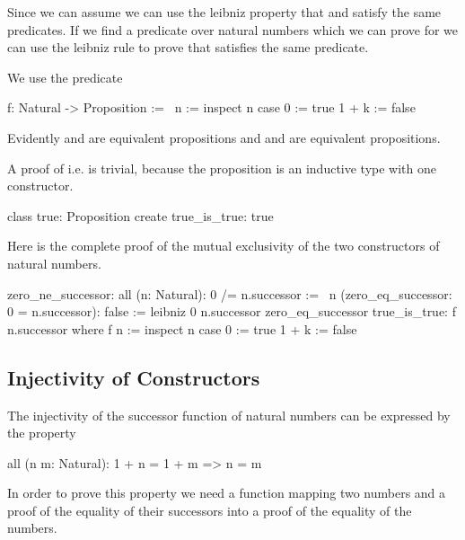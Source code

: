 Since we can assume  we can use the leibniz property that
 and  satisfy the same predicates. If we find a
predicate over natural numbers which we can prove for  we can use the
leibniz rule to prove that  satisfies the same predicate.

We use the predicate
\begin{alba}
    f: Natural -> Proposition :=
        \ n :=
            inspect n case
                0     := true
                1 + k := false
\end{alba}

Evidently  and  are equivalent propositions and  and  are equivalent propositions.

A proof of  i.e.  is trivial, because the proposition
 is an inductive type with one constructor.

\begin{alba}
    class
        true: Proposition
    create
        true_is_true: true
\end{alba}


Here is the complete proof of the mutual exclusivity of the two constructors of
natural numbers.


\begin{alba}
    zero_ne_successor:
        all (n: Natural): 0 /= n.successor
    :=
        \ n (zero_eq_successor: 0 = n.successor): false :=
            leibniz 0 n.successor zero_eq_successor true_is_true: f n.successor
            where
                f n :=
                    inspect n case
                        0     := true
                        1 + k := false
\end{alba}





\subsection{Injectivity of Constructors}

The injectivity of the successor function of natural numbers can be expressed
by the property

\begin{alba}
    all (n m: Natural): 1 + n = 1 + m  =>  n = m
\end{alba}

In order to prove this property we need a function mapping two numbers and a
proof of the equality of their successors into a proof of the equality of the
numbers.

